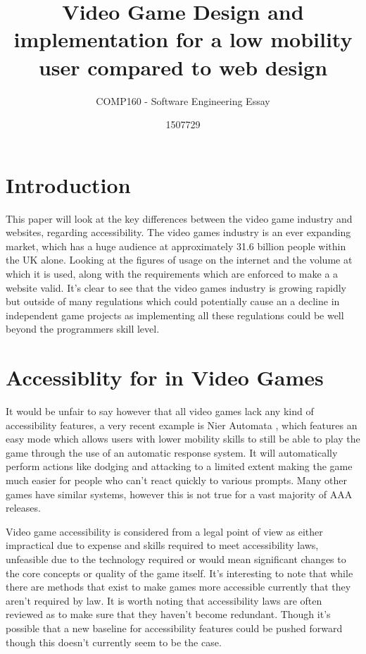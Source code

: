 \documentclass{scrartcl}
\title{Video Game Design and implementation for a low mobility user compared to web design}
\subtitle{COMP160 - Software Engineering Essay}
\author{1507729}
\begin{document}
\maketitle



\section{Introduction}

This paper will look at the key differences between the video game industry and websites, regarding accessibility. The video games industry is an ever expanding market, which has a huge audience at approximately 31.6 billion people within the UK alone. \cite{UKIE2017Games} Looking at the figures of usage on the internet and the volume at which it is used, along with the requirements which are enforced to make a a website valid. \cite{world2017internet} \cite{caldwell2008web} It's clear to see that the video games industry is growing rapidly but outside of many regulations which could potentially cause an a decline in independent game projects as implementing all these regulations could be well beyond the programmers skill level.

\section{Accessiblity for in Video Games}

It would be unfair to say however that all video games lack any kind of accessibility features, a very recent example is Nier Automata \cite{Platinum2017Nier}, which features an easy mode which allows users with lower mobility skills to still be able to play the game through the use of an automatic response system. It will automatically perform actions like dodging and attacking to a limited extent making the game much easier for people who can't react quickly to various prompts. Many other games have similar systems, however this is not true for a vast majority of AAA releases. 

Video game accessibility is considered from a legal point of view as either impractical due to expense and skills required to meet accessibility laws, unfeasible due to the technology required or would mean significant  changes to the core concepts or quality of the game itself. \cite{powers2015video} It's interesting to note that while there are methods that exist to make games more accessible currently that they aren't required by law. It is worth noting that accessibility laws are often reviewed as to make sure that they haven't become redundant. Though it's possible that a new baseline for accessibility features could be pushed forward though this doesn't currently seem to be the case.
\end{document}
